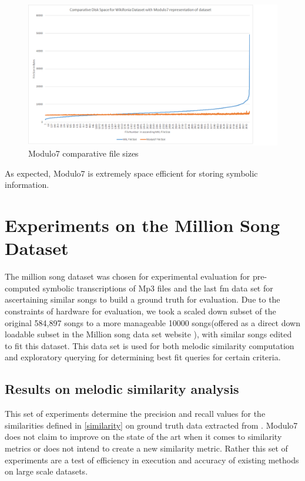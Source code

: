 \begin{figure}
\centering
\includegraphics[width=\textwidth]{M7Graph.png}
\makeatletter
\let\@currsize\normalsize
\caption{Modulo7 comparative file sizes}
\label{fig:filesizes}
\end{figure}

\noindent As expected, Modulo7 is extremely space efficient for storing symbolic information.
\section{Experiments on the Million Song \\ Dataset}

\noindent The million song dataset was chosen for experimental evaluation \cite{msd} for pre-computed symbolic transcriptions of Mp3 files and the last fm data set for ascertaining similar songs to build a ground truth for evaluation. Due to the constraints of hardware for evaluation, we took a scaled down subset of the original 584,897 songs to a more manageable 10000 songs(offered as a direct down loadable subset in the Million song data set website \cite{msddownloadable}), with similar songs edited to fit this dataset. This data set is used for both melodic similarity computation and exploratory querying for determining best fit queries for certain criteria.

\subsection{Results on melodic similarity analysis}

\noindent This set of experiments determine the precision and recall values for the similarities defined in \ref{similarity} on ground truth data extracted from \cite{msd}. Modulo7 does not claim to improve on the state of the art when it comes to similarity metrics or does not intend to create a new similarity metric. Rather this set of experiments are a test of efficiency in execution and accuracy of existing methods on large scale datasets. \\

